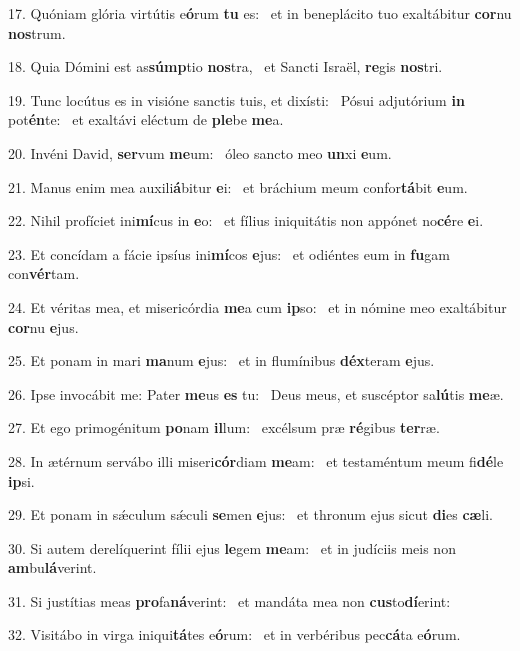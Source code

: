 17. Quóniam glória virtútis e\textbf{ó}rum \textbf{tu} es: \ast\  et in beneplácito tuo exaltábitur \textbf{cor}nu \textbf{nos}trum.\

18. Quia Dómini est as\textbf{súmp}tio \textbf{nos}tra, \ast\  et Sancti Israël, \textbf{re}gis \textbf{nos}tri.\

19. Tunc locútus es in visióne sanctis tuis, et dixísti: \dag\  Pósui adjutórium \textbf{in} pot\textbf{én}te: \ast\  et exaltávi eléctum de \textbf{ple}be \textbf{me}a.\

20. Invéni David, \textbf{ser}vum \textbf{me}um: \ast\  óleo sancto meo \textbf{un}xi \textbf{e}um.\

21. Manus enim mea auxili\textbf{á}bitur \textbf{e}i: \ast\  et bráchium meum confor\textbf{tá}bit \textbf{e}um.\

22. Nihil profíciet ini\textbf{mí}cus in \textbf{e}o: \ast\  et fílius iniquitátis non appónet no\textbf{cé}re \textbf{e}i.\

23. Et concídam a fácie ipsíus ini\textbf{mí}cos \textbf{e}jus: \ast\  et odiéntes eum in \textbf{fu}gam con\textbf{vér}tam.\

24. Et véritas mea, et misericórdia \textbf{me}a cum \textbf{ip}so: \ast\  et in nómine meo exaltábitur \textbf{cor}nu \textbf{e}jus.\

25. Et ponam in mari \textbf{ma}num \textbf{e}jus: \ast\  et in flumínibus \textbf{déx}teram \textbf{e}jus.\

26. Ipse invocábit me: Pater \textbf{me}us \textbf{es} tu: \ast\  Deus meus, et suscéptor sa\textbf{lú}tis \textbf{me}æ.\

27. Et ego primogénitum \textbf{po}nam \textbf{il}lum: \ast\  excélsum præ \textbf{ré}gibus \textbf{ter}ræ.\

28. In ætérnum servábo illi miseri\textbf{cór}diam \textbf{me}am: \ast\  et testaméntum meum fi\textbf{dé}le \textbf{ip}si.\

29. Et ponam in sǽculum sǽculi \textbf{se}men \textbf{e}jus: \ast\  et thronum ejus sicut \textbf{di}es \textbf{cæ}li.\

30. Si autem derelíquerint fílii ejus \textbf{le}gem \textbf{me}am: \ast\  et in judíciis meis non \textbf{am}bu\textbf{lá}verint.\

31. Si justítias meas \textbf{pro}fa\textbf{ná}verint: \ast\  et mandáta mea non \textbf{cus}to\textbf{dí}erint:\

32. Visitábo in virga iniqui\textbf{tá}tes e\textbf{ó}rum: \ast\  et in verbéribus pec\textbf{cá}ta e\textbf{ó}rum.\

